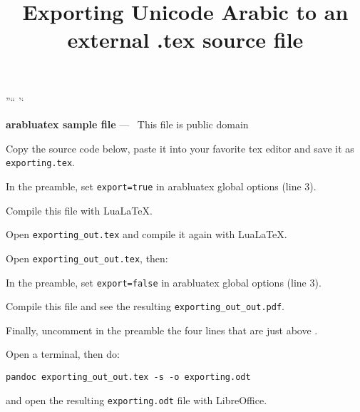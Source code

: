 \usepackage[fullvoc,export=false]{arabluatex}
\SetArbEasy

\usepackage{csquotes}
{\textquotedblright}{\textquotedblleft}
{\textquoteright}{\textquoteleft}

\usepackage{hyperxmp}
\usepackage{hyperref}

\title{\large Exporting Unicode Arabic to an external
  .tex source file}
\author{}
\date{}

\usepackage{xcolor}
\usepackage[outputdir=TMP]{minted}

\usepackage{ccicons}
\usepackage{paralist}



\vspace*{-.5in}
\noindent
\textbf{\textsf{arabluatex sample file}} --- \cczero\ This
file is public domain

\begin{compactenum}
\item Copy the source code below, paste it into your
  favorite tex editor and save it as
  \verb|exporting.tex|.
\item In the preamble, set \verb|export=true| in
  \textsf{arabluatex} global options (line 3).
\item Compile this file with Lua\LaTeX.
\item Open \verb|exporting_out.tex| and compile it again
  with Lua\LaTeX.
\item Open \verb|exporting_out_out.tex|, then:
  \begin{compactenum}
  \item In the preamble, set \verb|export=false| in
    \textsf{arabluatex} global options (line 3).
  \item Compile this file and see the resulting
    \verb|exporting_out_out.pdf|.
  \end{compactenum}
\item Finally, uncomment in the preamble the four lines
  that are just above \verb||.
\item Open a terminal, then do:
\begin{verbatim}
pandoc exporting_out_out.tex -s -o exporting.odt
\end{verbatim}
  and open the resulting \verb|exporting.odt| file with LibreOffice.
\end{compactenum}

